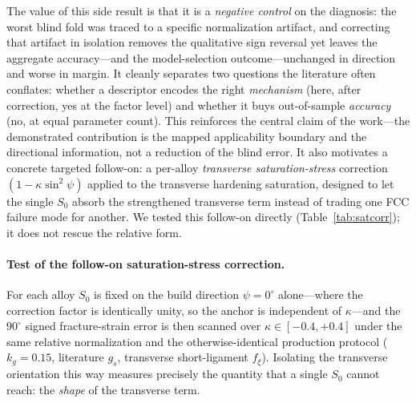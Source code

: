 \documentclass[11pt,a4paper,twocolumn]{article}
\begin{document}
The value of this side result is that it is a \emph{negative control} on the diagnosis: the worst blind fold was traced to a specific normalization artifact, and correcting that artifact in isolation removes the qualitative sign reversal yet leaves the aggregate accuracy---and the model-selection outcome---unchanged in direction and worse in margin. It cleanly separates two questions the literature often conflates: whether a descriptor encodes the right \emph{mechanism} (here, after correction, yes at the factor level) and whether it buys out-of-sample \emph{accuracy} (no, at equal parameter count). This reinforces the central claim of the work---the demonstrated contribution is the mapped applicability boundary and the directional information, not a reduction of the blind error. It also motivates a concrete targeted follow-on: a per-alloy \emph{transverse saturation-stress} correction $(1-\kappa\sin^2\psi)$ applied to the transverse hardening saturation, designed to let the single $S_0$ absorb the strengthened transverse term instead of trading one FCC failure mode for another. We tested this follow-on directly (Table~\ref{tab:satcorr}); it does not rescue the relative form.

\paragraph{Test of the follow-on saturation-stress correction.}
For each alloy $S_0$ is fixed on the build direction $\psi=0^\circ$ alone---where the correction factor is identically unity, so the anchor is independent of $\kappa$---and the $90^\circ$ signed fracture-strain error is then scanned over $\kappa\in[-0.4,+0.4]$ under the same relative normalization and the otherwise-identical production protocol ($k_g=0.15$, literature $g_s$, transverse short-ligament $f_\xi$). Isolating the transverse orientation this way measures precisely the quantity that a single $S_0$ cannot reach: the \emph{shape} of the transverse term.
\end{document}
